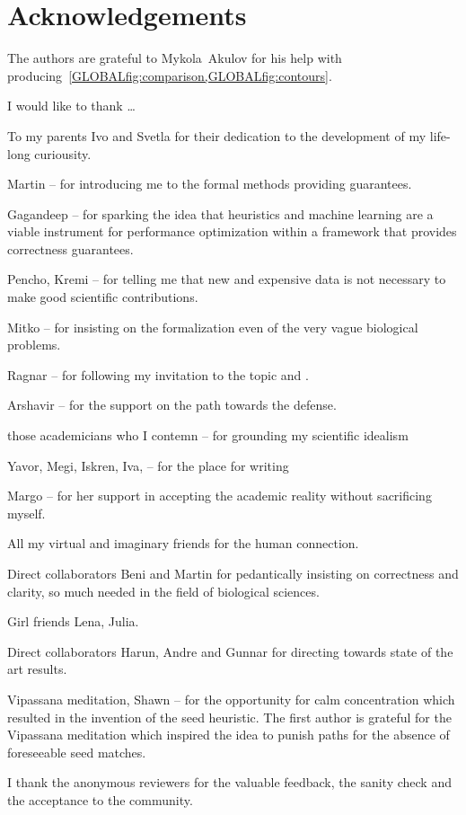 
\bigskip

\begingroup
\let\clearpage\relax
\let\cleardoublepage\relax
\let\cleardoublepage\relax
\chapter*{Acknowledgements}

\def\thanks#1{%
\begingroup
\leftskip1em
\noindent #1
\par
\endgroup
}

The authors are grateful to Mykola~Akulov for his help with
producing~\cref{GLOBALfig:comparison,GLOBALfig:contours}.

I would like to thank \dots

To my parents Ivo and Svetla for their dedication to the development of my
life-long curiousity.

Martin -- for introducing me to the formal methods providing guarantees.

Gagandeep -- for sparking the idea that heuristics and machine learning are a
viable instrument for performance optimization within a framework that provides
correctness guarantees.

Pencho, Kremi -- for telling me that new and expensive data is not necessary to make
good scientific contributions.

Mitko -- for insisting on the formalization even of the very vague biological
problems.

Ragnar -- for following my invitation to the topic and .

Arshavir -- for the support on the path towards the defense.

those academicians who I contemn -- for grounding my scientific idealism 

Yavor, Megi, Iskren, Iva, -- for the place for writing

Margo -- for her support in accepting the academic reality without sacrificing myself.

All my virtual and imaginary friends for the human connection.

Direct collaborators Beni and Martin for pedantically insisting on correctness
and clarity, so much needed in the field of biological sciences.

Girl friends Lena, Julia.

Direct collaborators Harun, Andre and Gunnar for directing towards state of the art results.

Vipassana meditation, Shawn -- for the opportunity for calm concentration which
resulted in the invention of the seed heuristic. The first author is grateful
for the Vipassana meditation which inspired the idea to punish paths for the
absence of foreseeable seed matches.

I thank the anonymous reviewers for the valuable feedback, the sanity check and
the acceptance to the community. 

\endgroup
